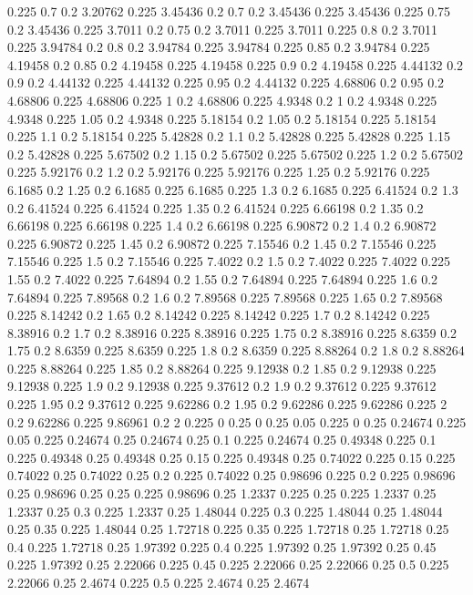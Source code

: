 0.225 0.7
0.2 3.20762
0.225 3.45436
0.2 0.7
0.2 3.45436
0.225 3.45436
0.225 0.75
0.2 3.45436
0.225 3.7011
0.2 0.75
0.2 3.7011
0.225 3.7011
0.225 0.8
0.2 3.7011
0.225 3.94784
0.2 0.8
0.2 3.94784
0.225 3.94784
0.225 0.85
0.2 3.94784
0.225 4.19458
0.2 0.85
0.2 4.19458
0.225 4.19458
0.225 0.9
0.2 4.19458
0.225 4.44132
0.2 0.9
0.2 4.44132
0.225 4.44132
0.225 0.95
0.2 4.44132
0.225 4.68806
0.2 0.95
0.2 4.68806
0.225 4.68806
0.225 1
0.2 4.68806
0.225 4.9348
0.2 1
0.2 4.9348
0.225 4.9348
0.225 1.05
0.2 4.9348
0.225 5.18154
0.2 1.05
0.2 5.18154
0.225 5.18154
0.225 1.1
0.2 5.18154
0.225 5.42828
0.2 1.1
0.2 5.42828
0.225 5.42828
0.225 1.15
0.2 5.42828
0.225 5.67502
0.2 1.15
0.2 5.67502
0.225 5.67502
0.225 1.2
0.2 5.67502
0.225 5.92176
0.2 1.2
0.2 5.92176
0.225 5.92176
0.225 1.25
0.2 5.92176
0.225 6.1685
0.2 1.25
0.2 6.1685
0.225 6.1685
0.225 1.3
0.2 6.1685
0.225 6.41524
0.2 1.3
0.2 6.41524
0.225 6.41524
0.225 1.35
0.2 6.41524
0.225 6.66198
0.2 1.35
0.2 6.66198
0.225 6.66198
0.225 1.4
0.2 6.66198
0.225 6.90872
0.2 1.4
0.2 6.90872
0.225 6.90872
0.225 1.45
0.2 6.90872
0.225 7.15546
0.2 1.45
0.2 7.15546
0.225 7.15546
0.225 1.5
0.2 7.15546
0.225 7.4022
0.2 1.5
0.2 7.4022
0.225 7.4022
0.225 1.55
0.2 7.4022
0.225 7.64894
0.2 1.55
0.2 7.64894
0.225 7.64894
0.225 1.6
0.2 7.64894
0.225 7.89568
0.2 1.6
0.2 7.89568
0.225 7.89568
0.225 1.65
0.2 7.89568
0.225 8.14242
0.2 1.65
0.2 8.14242
0.225 8.14242
0.225 1.7
0.2 8.14242
0.225 8.38916
0.2 1.7
0.2 8.38916
0.225 8.38916
0.225 1.75
0.2 8.38916
0.225 8.6359
0.2 1.75
0.2 8.6359
0.225 8.6359
0.225 1.8
0.2 8.6359
0.225 8.88264
0.2 1.8
0.2 8.88264
0.225 8.88264
0.225 1.85
0.2 8.88264
0.225 9.12938
0.2 1.85
0.2 9.12938
0.225 9.12938
0.225 1.9
0.2 9.12938
0.225 9.37612
0.2 1.9
0.2 9.37612
0.225 9.37612
0.225 1.95
0.2 9.37612
0.225 9.62286
0.2 1.95
0.2 9.62286
0.225 9.62286
0.225 2
0.2 9.62286
0.225 9.86961
0.2 2
0.225 0
0.25 0
0.25 0.05
0.225 0
0.25 0.24674
0.225 0.05
0.225 0.24674
0.25 0.24674
0.25 0.1
0.225 0.24674
0.25 0.49348
0.225 0.1
0.225 0.49348
0.25 0.49348
0.25 0.15
0.225 0.49348
0.25 0.74022
0.225 0.15
0.225 0.74022
0.25 0.74022
0.25 0.2
0.225 0.74022
0.25 0.98696
0.225 0.2
0.225 0.98696
0.25 0.98696
0.25 0.25
0.225 0.98696
0.25 1.2337
0.225 0.25
0.225 1.2337
0.25 1.2337
0.25 0.3
0.225 1.2337
0.25 1.48044
0.225 0.3
0.225 1.48044
0.25 1.48044
0.25 0.35
0.225 1.48044
0.25 1.72718
0.225 0.35
0.225 1.72718
0.25 1.72718
0.25 0.4
0.225 1.72718
0.25 1.97392
0.225 0.4
0.225 1.97392
0.25 1.97392
0.25 0.45
0.225 1.97392
0.25 2.22066
0.225 0.45
0.225 2.22066
0.25 2.22066
0.25 0.5
0.225 2.22066
0.25 2.4674
0.225 0.5
0.225 2.4674
0.25 2.4674
